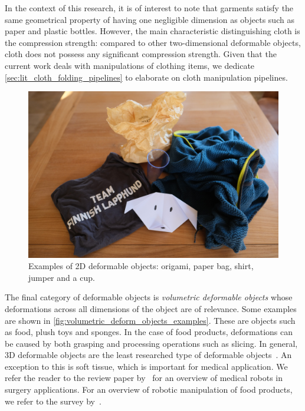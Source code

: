 In the context of this research, it is of interest to note that garments satisfy the same geometrical property of having one negligible dimension as objects such as paper and plastic bottles. However, the main characteristic distinguishing cloth is the compression strength: compared to other two-dimensional deformable objects, cloth does not possess any significant compression strength. Given that the current work deals with manipulations of clothing items, we dedicate \cref{sec:lit_cloth_folding_pipelines} to elaborate on cloth manipulation pipelines.

\begin{figure}[htbp!]
    \centering
    \includegraphics[keepaspectratio,width=\textwidth]{figures/fig_2d_deformables_ex.JPG}
    \caption{Examples of 2D deformable objects: origami, paper bag, shirt, jumper and a cup.}
    \label{fig:planar_deform_objects_examples}
\end{figure}

The final category of deformable objects is \textit{volumetric deformable objects} whose deformations across all dimensions of the object are of relevance. Some examples are shown in \cref{fig:volumetric_deform_objects_examples}. These are objects such as food, plush toys and sponges. In the case of food products, deformations can be caused by both grasping and processing operations such as slicing. In general, 3D deformable objects are the least researched type of deformable objects~\autocite{Sanchez2018}. An exception to this is soft tissue, which is important for medical application. We refer the reader to the review paper by~\textcite{Taylor2016} for an overview of medical robots in surgery applications. For an overview of robotic manipulation of food products, we refer to the survey by~\textcite{Chua2003}.

